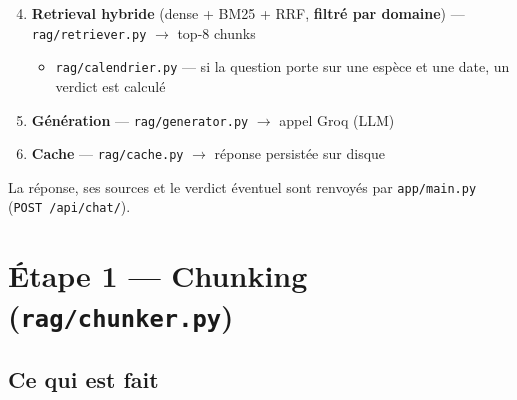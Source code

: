 \documentclass[11pt]{article}
\begin{document}
\begin{enumerate}
  \setcounter{enumi}{3}
  \item \textbf{Retrieval hybride} (dense + BM25 + RRF, \textbf{filtré par domaine}) ---
        \texttt{rag/retriever.py} $\rightarrow$ top-8 chunks
        \begin{itemize}
          \item[$\hookrightarrow$] \texttt{rag/calendrier.py} --- si la question porte sur une
                espèce et une date, un verdict est calculé
        \end{itemize}
  \item \textbf{Génération} --- \texttt{rag/generator.py} $\rightarrow$ appel Groq (LLM)
  \item \textbf{Cache} --- \texttt{rag/cache.py} $\rightarrow$ réponse persistée sur disque
\end{enumerate}

La réponse, ses sources et le verdict éventuel sont renvoyés par \texttt{app/main.py}
(\texttt{POST /api/chat/}).

\section{Étape 1 --- Chunking (\texttt{rag/chunker.py})}

\subsection*{Ce qui est fait}
\end{document}
